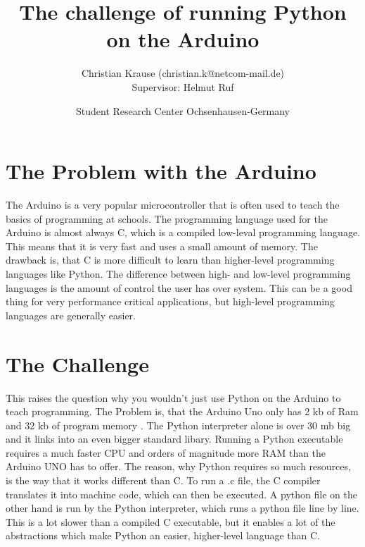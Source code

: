 \documentclass{article}
\title{The challenge of running Python on the Arduino}
\author{Christian Krause \small(christian.k@netcom-mail.de)\\[0.1cm]{\small Supervisor: Helmut Ruf}}
\date{\small Student Research Center Ochsenhausen-Germany}
\begin{document}
\maketitle
\begin{multicols}{2}
\section{The Problem with the Arduino}
\noindent The Arduino is a very popular microcontroller that is often used to teach the basics of programming at schools. The programming language used for the Arduino is almost always C, which is a compiled low-leval programming language. This means that it is very fast and uses a small amount of memory. The drawback is, that C is more difficult to learn than higher-level programming languages like Python. The difference between high- and low-level programming languages is the amount of control the user has over system. This can be a good thing for very performance critical applications, but high-level programming languages are generally easier.%

\section{The Challenge}
\noindent This raises the question why you wouldn't just use Python on the Arduino to teach programming. The Problem is, that the Arduino Uno only has 2 kb of Ram and 32 kb of program memory \cite{Q1}. The Python interpreter alone is over 30 mb big and it links into an even bigger standard libary. Running a Python executable requires a much faster CPU and orders of magnitude more RAM than the Arduino UNO has to offer. %
The reason, why Python requires so much resources, is the way that it works different than C. To run a .c file, the C compiler translates it into machine code, which can then be executed. A python file on the other hand is run by the Python interpreter, which runs a python file line by line. This is a lot slower than a compiled C executable, but it enables a lot of the abstractions which make Python an easier, higher-level language than C.


\end{multicols}
\end{document}
